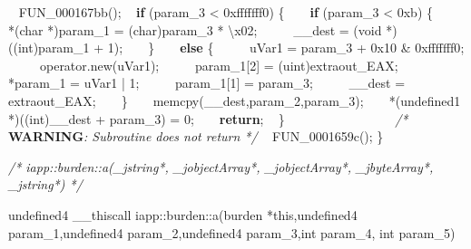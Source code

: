 \documentclass[
]{article}
\newenvironment{Shaded}{}{}
\newcommand{\AlertTok}[1]{\textcolor[rgb]{1.00,0.00,0.00}{\textbf{#1}}}
\newcommand{\BaseNTok}[1]{\textcolor[rgb]{0.25,0.63,0.44}{#1}}
\newcommand{\CharTok}[1]{\textcolor[rgb]{0.25,0.44,0.63}{#1}}
\newcommand{\CommentTok}[1]{\textcolor[rgb]{0.38,0.63,0.69}{\textit{#1}}}
\newcommand{\ControlFlowTok}[1]{\textcolor[rgb]{0.00,0.44,0.13}{\textbf{#1}}}
\newcommand{\DataTypeTok}[1]{\textcolor[rgb]{0.56,0.13,0.00}{#1}}
\newcommand{\DecValTok}[1]{\textcolor[rgb]{0.25,0.63,0.44}{#1}}
\newcommand{\NormalTok}[1]{#1}
\newcommand{\OperatorTok}[1]{\textcolor[rgb]{0.40,0.40,0.40}{#1}}
\newcommand{\SpecialCharTok}[1]{\textcolor[rgb]{0.25,0.44,0.63}{#1}}
\begin{document}
\begin{Shaded}
\begin{Highlighting}[]
\NormalTok{  FUN\_000167bb}\OperatorTok{();}
  \ControlFlowTok{if} \OperatorTok{(}\NormalTok{param\_3 }\OperatorTok{\textless{}} \BaseNTok{0xfffffff0}\OperatorTok{)} \OperatorTok{\{}
    \ControlFlowTok{if} \OperatorTok{(}\NormalTok{param\_3 }\OperatorTok{\textless{}} \BaseNTok{0xb}\OperatorTok{)} \OperatorTok{\{}
      \OperatorTok{*(}\DataTypeTok{char} \OperatorTok{*)}\NormalTok{param\_1 }\OperatorTok{=} \OperatorTok{(}\DataTypeTok{char}\OperatorTok{)}\NormalTok{param\_3 }\OperatorTok{*} \CharTok{\textquotesingle{}}\SpecialCharTok{\textbackslash{}x02}\CharTok{\textquotesingle{}}\OperatorTok{;}
\NormalTok{      \_\_dest }\OperatorTok{=} \OperatorTok{(}\DataTypeTok{void} \OperatorTok{*)((}\DataTypeTok{int}\OperatorTok{)}\NormalTok{param\_1 }\OperatorTok{+} \DecValTok{1}\OperatorTok{);}
    \OperatorTok{\}}
    \ControlFlowTok{else} \OperatorTok{\{}
\NormalTok{      uVar1 }\OperatorTok{=}\NormalTok{ param\_3 }\OperatorTok{+} \BaseNTok{0x10} \OperatorTok{\&} \BaseNTok{0xfffffff0}\OperatorTok{;}
\NormalTok{      operator}\OperatorTok{.}\NormalTok{new}\OperatorTok{(}\NormalTok{uVar1}\OperatorTok{);}
\NormalTok{      param\_1}\OperatorTok{[}\DecValTok{2}\OperatorTok{]} \OperatorTok{=} \OperatorTok{(}\NormalTok{uint}\OperatorTok{)}\NormalTok{extraout\_EAX}\OperatorTok{;}
      \OperatorTok{*}\NormalTok{param\_1 }\OperatorTok{=}\NormalTok{ uVar1 }\OperatorTok{|} \DecValTok{1}\OperatorTok{;}
\NormalTok{      param\_1}\OperatorTok{[}\DecValTok{1}\OperatorTok{]} \OperatorTok{=}\NormalTok{ param\_3}\OperatorTok{;}
\NormalTok{      \_\_dest }\OperatorTok{=}\NormalTok{ extraout\_EAX}\OperatorTok{;}
    \OperatorTok{\}}
\NormalTok{    memcpy}\OperatorTok{(}\NormalTok{\_\_dest}\OperatorTok{,}\NormalTok{param\_2}\OperatorTok{,}\NormalTok{param\_3}\OperatorTok{);}
    \OperatorTok{*(}\NormalTok{undefined1 }\OperatorTok{*)((}\DataTypeTok{int}\OperatorTok{)}\NormalTok{\_\_dest }\OperatorTok{+}\NormalTok{ param\_3}\OperatorTok{)} \OperatorTok{=} \DecValTok{0}\OperatorTok{;}
    \ControlFlowTok{return}\OperatorTok{;}
  \OperatorTok{\}}
                    \CommentTok{/* }\AlertTok{WARNING}\CommentTok{: Subroutine does not return */}
\NormalTok{  FUN\_0001659c}\OperatorTok{();}
\OperatorTok{\}}


\CommentTok{/* iapp::burden::a(\_jstring*, \_jobjectArray*, \_jobjectArray*, \_jbyteArray*, \_jstring*) */}

\NormalTok{undefined4 \_\_thiscall}
\NormalTok{iapp}\OperatorTok{::}\NormalTok{burden}\OperatorTok{::}\NormalTok{a}\OperatorTok{(}\NormalTok{burden }\OperatorTok{*}\NormalTok{this}\OperatorTok{,}\NormalTok{undefined4 param\_1}\OperatorTok{,}\NormalTok{undefined4 param\_2}\OperatorTok{,}\NormalTok{undefined4 param\_3}\OperatorTok{,}\DataTypeTok{int}\NormalTok{ param\_4}\OperatorTok{,}
               \DataTypeTok{int}\NormalTok{ param\_5}\OperatorTok{)}


\end{Highlighting}
\end{Shaded}
\end{document}
